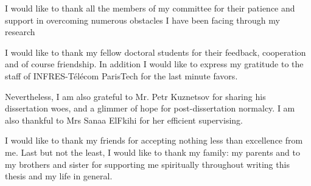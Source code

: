 \begin{acknowledgements}
I would like to thank all the members of my committee for their patience and support in overcoming numerous obstacles I have been facing through my research

I would like to thank my fellow doctoral students for their feedback, cooperation and of course friendship. In addition I would like to express my gratitude to the staff of INFRES-Télécom ParisTech for the last minute favors.

Nevertheless, I am also grateful to Mr. Petr Kuznetsov for sharing his dissertation woes, and a glimmer of hope for post-dissertation normalcy. I am also thankful to Mrs Sanaa ElFkihi for her efficient supervising.

I would like to thank my friends for accepting nothing less than excellence from me. Last but not the least, I would like to thank my family: my parents and to my brothers and sister for supporting me spiritually throughout writing this thesis and my life in general.
\end{acknowledgements}